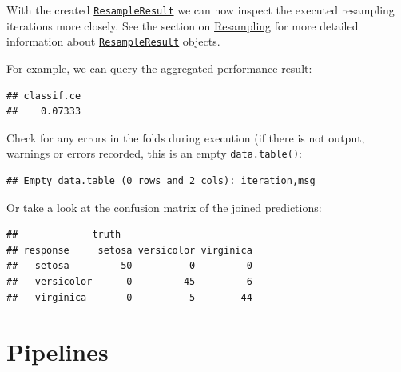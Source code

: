\documentclass[]{scrbook}
\newenvironment{Shaded}{\begin{snugshade}}{\end{snugshade}}
\newcommand{\KeywordTok}[1]{\textcolor[rgb]{0.13,0.29,0.53}{\textbf{#1}}}
\newcommand{\NormalTok}[1]{#1}
\newcommand{\OperatorTok}[1]{\textcolor[rgb]{0.81,0.36,0.00}{\textbf{#1}}}
\renewenvironment{Shaded} {\begin{snugshade}\small} {\end{snugshade}}
\begin{document}
With the created \href{https://mlr3.mlr-org.com/reference/ResampleResult.html}{\texttt{ResampleResult}} we can now inspect the executed resampling iterations more closely.
See the section on \protect\hyperlink{resampling}{Resampling} for more detailed information about \href{https://mlr3.mlr-org.com/reference/ResampleResult.html}{\texttt{ResampleResult}} objects.

For example, we can query the aggregated performance result:

\begin{Shaded}
\end{Shaded}

\begin{verbatim}
## classif.ce 
##    0.07333
\end{verbatim}

Check for any errors in the folds during execution (if there is not output, warnings or errors recorded, this is an empty \texttt{data.table()}:

\begin{Shaded}
\end{Shaded}

\begin{verbatim}
## Empty data.table (0 rows and 2 cols): iteration,msg
\end{verbatim}

Or take a look at the confusion matrix of the joined predictions:

\begin{Shaded}
\end{Shaded}

\begin{verbatim}
##             truth
## response     setosa versicolor virginica
##   setosa         50          0         0
##   versicolor      0         45         6
##   virginica       0          5        44
\end{verbatim}

\hypertarget{pipelines}{%
\chapter{Pipelines}\label{pipelines}}
\end{document}
